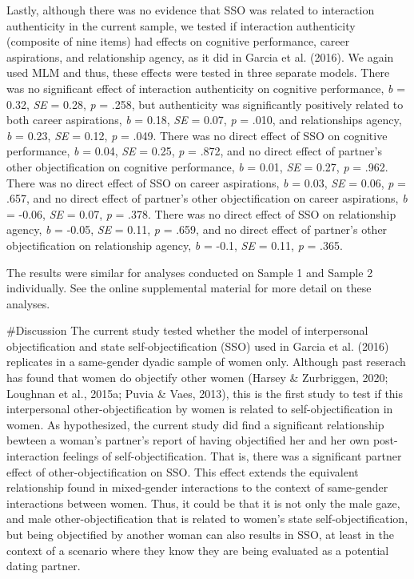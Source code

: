 \documentclass[
  man]{apa6}
\begin{document}
Lastly, although there was no evidence that SSO was related to interaction authenticity in the current sample, we tested if interaction authenticity (composite of nine items) had effects on cognitive performance, career aspirations, and relationship agency, as it did in Garcia et al. (2016). We again used MLM and thus, these effects were tested in three separate models. There was no significant effect of interaction authenticity on cognitive performance, \emph{b} = 0.32, \emph{SE} = 0.28, \emph{p} = .258, but authenticity was significantly positively related to both career aspirations, \emph{b} = 0.18, \emph{SE} = 0.07, \emph{p} = .010, and relationships agency, \emph{b} = 0.23, \emph{SE} = 0.12, \emph{p} = .049. There was no direct effect of SSO on cognitive performance, \emph{b} = 0.04, \emph{SE} = 0.25, \emph{p} = .872, and no direct effect of partner's other objectification on cognitive performance, \emph{b} = 0.01, \emph{SE} = 0.27, \emph{p} = .962. There was no direct effect of SSO on career aspirations, \emph{b} = 0.03, \emph{SE} = 0.06, \emph{p} = .657, and no direct effect of partner's other objectification on career aspirations, \emph{b} = -0.06, \emph{SE} = 0.07, \emph{p} = .378. There was no direct effect of SSO on relationship agency, \emph{b} = -0.05, \emph{SE} = 0.11, \emph{p} = .659, and no direct effect of partner's other objectification on relationship agency, \emph{b} = -0.1, \emph{SE} = 0.11, \emph{p} = .365.

The results were similar for analyses conducted on Sample 1 and Sample 2 individually. See the online supplemental material for more detail on these analyses.

\#Discussion
The current study tested whether the model of interpersonal objectification and state self-objectification (SSO) used in Garcia et al. (2016) replicates in a same-gender dyadic sample of women only. Although past reserach has found that women do objectify other women (Harsey \& Zurbriggen, 2020; Loughnan et al., 2015a; Puvia \& Vaes, 2013), this is the first study to test if this interpersonal other-objectification by women is related to self-objectification in women. As hypothesized, the current study did find a significant relationship bewteen a woman's partner's report of having objectified her and her own post-interaction feelings of self-objectification. That is, there was a significant partner effect of other-objectification on SSO. This effect extends the equivalent relationship found in mixed-gender interactions to the context of same-gender interactions between women. Thus, it could be that it is not only the male gaze, and male other-objectification that is related to women's state self-objectification, but being objectified by another woman can also results in SSO, at least in the context of a scenario where they know they are being evaluated as a potential dating partner.
\end{document}
